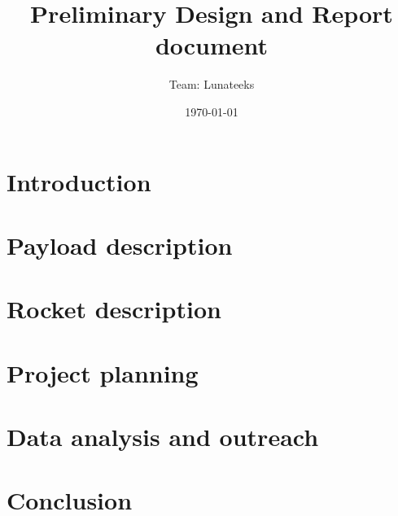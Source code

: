 \documentclass[11pt]{article}
\title{Preliminary Design and Report document}
\author{Team: Lunateeks}
\date{\today}
\begin{document}
\cansattitle

\tableofcontents
\pagestyle{plain}

\newpage

\section{Introduction}



\section{Payload description}



\section{Rocket description}



\section{Project planning}



\section{Data analysis and outreach}



\section{Conclusion}




\end{document}
